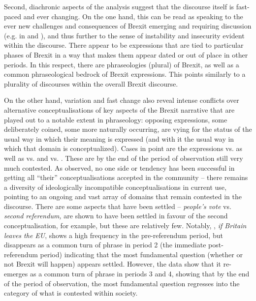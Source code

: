 \documentclass[output=paper]{langscibook}
\begin{document}
Second, diachronic aspects of the analysis suggest that the discourse itself is fast-paced and ever changing. On the one hand, this can be read as speaking to the ever new challenges and consequences of Brexit emerging and requiring discussion (e.g. in  and ), and thus further to the sense of instability and insecurity evident within the discourse. There appear to be expressions that are tied to particular phases of Brexit in a way that makes them appear dated or out of place in other periods. In this respect, there are phraseologies (plural) of Brexit, as well as a common phraseological bedrock of Brexit expressions. This points similarly to a plurality of discourses within the overall Brexit discourse.

On the other hand, variation and fast change also reveal intense conflicts over alternative conceptualisations of key aspects of the Brexit narrative that are played out to a notable extent in phraseology: opposing expressions, some deliberately coined, some more naturally occurring, are vying for the status of the usual way in which their meaning is expressed (and with it the usual way in which that domain is conceptualized). Cases in point are the expressions  vs.  as well as  vs.  and  vs. . These are by the end of the period of observation still very much contested. As observed, no one side or tendency has been successful in getting all ``their'' conceptualisations accepted in the community -- there remains a diversity of ideologically incompatible conceptualisations in current use, pointing to an ongoing and vast array of domains that remain contested in the discourse. There are some aspects that have been settled -- \textit{people’s vote} vs. \textit{second referendum,} are shown to have been settled in favour of the second conceptualisation, for example, but these are relatively few. Notably, , \textit{if Britain leaves the EU}, shows a high frequency in the pre-referendum period, but disappears as a common turn of phrase in period 2 (the immediate post-referendum period) indicating that the most fundamental question (whether or not Brexit will happen) appears settled. However, the data show that it re-emerges as a common turn of phrase in periods 3 and 4, showing that by the end of the period of observation, the most fundamental question regresses into the category of what is contested within society.
\end{document}

